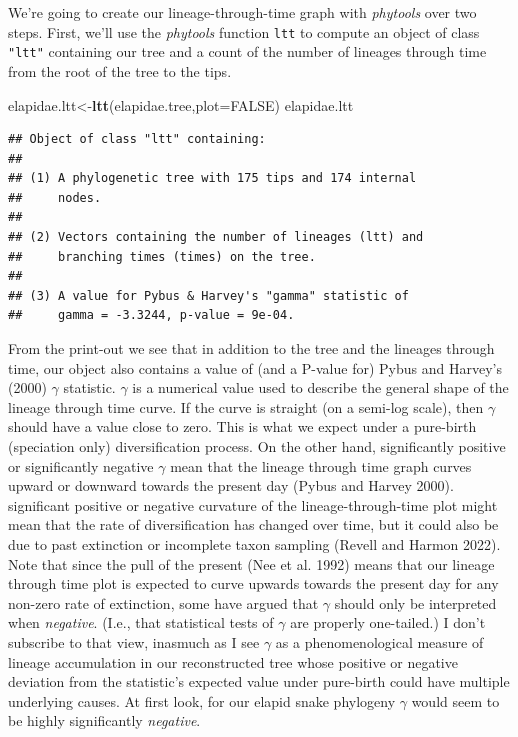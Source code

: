 \documentclass[fleqn,10pt,lineno]{wlpeerj} %
\newenvironment{Shaded}{\begin{snugshade}}{\end{snugshade}}
\newcommand{\AttributeTok}[1]{\textcolor[rgb]{0.13,0.29,0.53}{#1}}
\newcommand{\ConstantTok}[1]{\textcolor[rgb]{0.56,0.35,0.01}{#1}}
\newcommand{\FunctionTok}[1]{\textcolor[rgb]{0.13,0.29,0.53}{\textbf{#1}}}
\newcommand{\NormalTok}[1]{#1}
\newcommand{\OtherTok}[1]{\textcolor[rgb]{0.56,0.35,0.01}{#1}}
\begin{document}
We're going to create our lineage-through-time graph with \emph{phytools} over two steps. First, we'll use the \emph{phytools} function \texttt{ltt} to compute an object of class \texttt{"ltt"} containing our tree and a count of the number of lineages through time from the root of the tree to the tips.

\begin{Shaded}
\begin{Highlighting}[]
\NormalTok{elapidae.ltt}\OtherTok{\textless{}{-}}\FunctionTok{ltt}\NormalTok{(elapidae.tree,}\AttributeTok{plot=}\ConstantTok{FALSE}\NormalTok{)}
\NormalTok{elapidae.ltt}
\end{Highlighting}
\end{Shaded}

\begin{verbatim}
## Object of class "ltt" containing:
## 
## (1) A phylogenetic tree with 175 tips and 174 internal
##     nodes.
## 
## (2) Vectors containing the number of lineages (ltt) and
##     branching times (times) on the tree.
## 
## (3) A value for Pybus & Harvey's "gamma" statistic of
##     gamma = -3.3244, p-value = 9e-04.
\end{verbatim}

From the print-out we see that in addition to the tree and the lineages through time, our object also contains a value of (and a P-value for) Pybus and Harvey's (2000) \(\gamma\) statistic. \(\gamma\) is a numerical value used to describe the general shape of the lineage through time curve. If the curve is straight (on a semi-log scale), then \(\gamma\) should have a value close to zero. This is what we expect under a pure-birth (speciation only) diversification process. On the other hand, significantly positive or significantly negative \(\gamma\) mean that the lineage through time graph curves upward or downward towards the present day (Pybus and Harvey 2000). significant positive or negative curvature of the lineage-through-time plot might mean that the rate of diversification has changed over time, but it could also be due to past extinction or incomplete taxon sampling (Revell and Harmon 2022). Note that since the pull of the present (Nee et al. 1992) means that our lineage through time plot is expected to curve upwards towards the present day for any non-zero rate of extinction, some have argued that \(\gamma\) should only be interpreted when \emph{negative}. (I.e., that statistical tests of \(\gamma\) are properly one-tailed.) I don't subscribe to that view, inasmuch as I see \(\gamma\) as a phenomenological measure of lineage accumulation in our reconstructed tree whose positive or negative deviation from the statistic's expected value under pure-birth could have multiple underlying causes. At first look, for our elapid snake phylogeny \(\gamma\) would seem to be highly significantly \emph{negative}.
\end{document}
